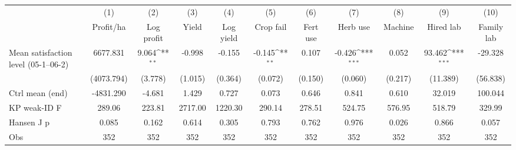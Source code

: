 {
\def\sym#1{\ifmmode^{#1}\else\(^{#1}\)\fi}
\begin{tabular}{l*{10}{c}}
\toprule
                    &\multicolumn{1}{c}{(1)}&\multicolumn{1}{c}{(2)}&\multicolumn{1}{c}{(3)}&\multicolumn{1}{c}{(4)}&\multicolumn{1}{c}{(5)}&\multicolumn{1}{c}{(6)}&\multicolumn{1}{c}{(7)}&\multicolumn{1}{c}{(8)}&\multicolumn{1}{c}{(9)}&\multicolumn{1}{c}{(10)}\\
                    &\multicolumn{1}{c}{Profit/ha}&\multicolumn{1}{c}{Log profit}&\multicolumn{1}{c}{Yield}&\multicolumn{1}{c}{Log yield}&\multicolumn{1}{c}{Crop fail}&\multicolumn{1}{c}{Fert use}&\multicolumn{1}{c}{Herb use}&\multicolumn{1}{c}{Machine}&\multicolumn{1}{c}{Hired lab}&\multicolumn{1}{c}{Family lab}\\
\midrule
Mean satisfaction level (05-1--06-2)&    6677.831         &       9.064\sym{**} &      -0.998         &      -0.155         &      -0.145\sym{**} &       0.107         &      -0.426\sym{***}&       0.052         &      93.462\sym{***}&     -29.328         \\
                    &  (4073.794)         &     (3.778)         &     (1.015)         &     (0.364)         &     (0.072)         &     (0.150)         &     (0.060)         &     (0.217)         &    (11.389)         &    (56.838)         \\
\midrule
Ctrl mean (end)     &   -4831.290         &      -4.681         &       1.429         &       0.727         &       0.073         &       0.646         &       0.841         &       0.610         &      32.019         &     100.044         \\
KP weak-ID F        &      289.06         &      223.81         &     2717.00         &     1220.30         &      290.14         &      278.51         &      524.75         &      576.95         &      518.79         &      329.99         \\
Hansen J p          &       0.085         &       0.162         &       0.614         &       0.305         &       0.793         &       0.762         &       0.976         &       0.026         &       0.866         &       0.057         \\
Obs                 &         352         &         352         &         352         &         352         &         352         &         352         &         352         &         352         &         352         &         352         \\
\bottomrule
\end{tabular}
}
